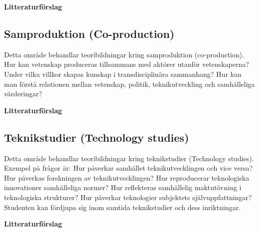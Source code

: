 \documentclass[12pt,a4paper]{article}
\begin{document}
\noindent \textbf{Litteraturförslag}

 \fullcite{}
 
 \fullcite{}
  
 \fullcite{}

\subsection{Samproduktion (Co-production)} 
Detta område behandlar teoribildningar kring samproduktion (co-production). Hur kan vetenskap produceras tillsammans med aktörer utanför vetenskaperna? Under vilka villkor skapas kunskap i transdisciplinära sammanhang? Hur kan man förstå relationen mellan vetenskap, politik, teknikutveckling och samhälleliga värderingar? 


\noindent \textbf{Litteraturförslag}

 \fullcite{}
 
 \fullcite{}
  
 \fullcite{}

\subsection{Teknikstudier (Technology studies)}
 Detta område behandlar teoribildningar kring teknikstudier (Technology studies). Exempel på frågor är: Hur påverkar samhället teknikutvecklingen och vice versa? Hur påverkas forskningen av teknikutvecklingen? Hur reproducerar teknologiska innovationer samhälleliga normer? Hur reflekteras samhällelig maktutövning i teknologiska strukturer? Hur påverkar teknologier subjektets självuppfattningar? Studenten kan fördjupa sig inom samtida teknikstudier och dess inriktningar. 
 
 
\noindent \textbf{Litteraturförslag}

 \fullcite{}
 
 \fullcite{}
  
 \fullcite{}
\end{document}
